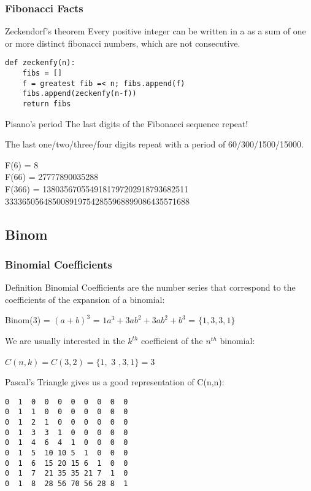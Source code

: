 \documentclass{beamer}
\begin{document}
\begin{frame}[fragile]
  \frametitle{Fibonacci Facts}
  {\smaller
  \begin{block}{Zeckendorf's theorem}
    Every positive integer can be written in a  as a sum of
    one or more distinct fibonacci numbers, which are not consecutive.

\begin{verbatim}
def zeckenfy(n):
    fibs = []
    f = greatest fib =< n; fibs.append(f)
    fibs.append(zeckenfy(n-f))
    return fibs
\end{verbatim}
  \end{block}

  \begin{block}{Pisano's period} 
    The last digits of the Fibonacci sequence repeat!

    \medskip

    The last one/two/\alert{three/four} digits repeat with a period of
    60/300/\alert{1500/15000}.

    F(6) = 8\\ 
    F(66) = 27777890035288\\
    F(366) = 1380356705549181797202918793682511 3333650564850089197542855968899086435571688

  \end{block}
  }
\end{frame}

\subsection{Binom}

\begin{frame}[fragile]
  \frametitle{Binomial Coefficients}
  {\smaller

    \begin{block}{Definition}
      Binomial Coefficients are the number series that correspond to
      the coefficients of the expansion of a binomial:

      \medskip

      Binom(3) = $(a+b)^3$ = $1a^3 + 3ab^2 + 3ab^2 + b^3$ = $\{1,3,3,1\}$ 

      \medskip

      We are usually interested in the $k^{th}$ coefficient of the
      $n^{th}$ binomial:
      
      \medskip

      $C(n,k) = C(3,2) = \{1,$ \alert{3} $,3,1\} = 3$

    \end{block}

    Pascal's Triangle gives us a good representation of C(n,n):
\begin{verbatim}
0  1  0  0  0  0  0  0  0  0
0  1  1  0  0  0  0  0  0  0
0  1  2  1  0  0  0  0  0  0
0  1  3  3  1  0  0  0  0  0
0  1  4  6  4  1  0  0  0  0
0  1  5  10 10 5  1  0  0  0
0  1  6  15 20 15 6  1  0  0
0  1  7  21 35 35 21 7  1  0
0  1  8  28 56 70 56 28 8  1
\end{verbatim}
  }
\end{frame}
\end{document}
